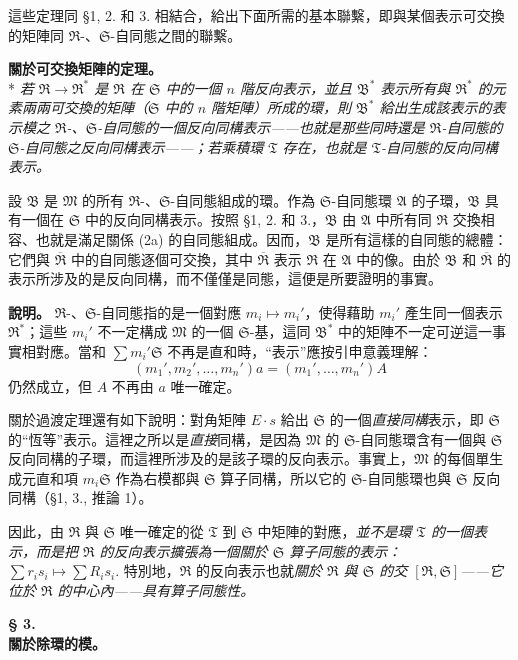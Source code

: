 \documentclass[11pt]{article}
\providecommand{\frR}{\mathfrak R}
\providecommand{\frS}{\mathfrak S}
\providecommand{\frT}{\mathfrak T}
\providecommand{\frM}{\mathfrak M}
\providecommand{\frB}{\mathfrak B}
\providecommand{\mA}{\mathfrak A}
\begin{document}
這些定理同 §1, 2. 和 3. 相結合，給出下面所需的基本聯繫，即與某個表示可交換的矩陣同 \(\frR\)-、\(\frS\)-自同態之間的聯繫。

\noindent\textbf{關於可交換矩陣的定理。}\\*
\emph{若 \(\frR\to\frR^*\) 是 \(\frR\) 在 \(\frS\) 中的一個 \(n\) 階反向表示，並且 \(\frB^*\) 表示所有與 \(\frR^*\) 的元素兩兩可交換的矩陣（\(\frS\) 中的 \(n\) 階矩陣）所成的環，則 \(\frB^*\) 給出生成該表示的表示模之 \(\frR\)-、\(\frS\)-自同態的一個反向同構表示——也就是那些同時還是 \(\frR\)-自同態的 \(\frS\)-自同態之反向同構表示——；若乘積環 \(\frT\) 存在，也就是 \(\frT\)-自同態的反向同構表示。}

設 \(\frB\) 是 \(\frM\) 的所有 \(\frR\)-、\(\frS\)-自同態組成的環。作為 \(\frS\)-自同態環 \(\mA\) 的子環，\(\frB\) 具有一個在 \(\frS\) 中的反向同構表示。按照 §1, 2. 和 3.，\(\frB\) 由 \(\mA\) 中所有同 \(\frR\) 交換相容、也就是滿足關係 (2a) 的自同態組成。因而，\(\frB\) 是所有這樣的自同態的總體：它們與 \(\overline{\frR}\) 中的自同態逐個可交換，其中 \(\overline{\frR}\) 表示 \(\frR\) 在 \(\mA\) 中的像。由於 \(\frB\) 和 \(\overline{\frR}\) 的表示所涉及的是反向同構，而不僅僅是同態，這便是所要證明的事實。

\noindent\textbf{說明。} \(\frR\)-、\(\frS\)-自同態指的是一個對應 \(m_i\mapsto m_i'\)，使得藉助 \(m_i'\) 產生同一個表示 \(\frR^*\)；這些 \(m_i'\) 不一定構成 \(\frM\) 的一個 \(\frS\)-基，這同 \(\frB^*\) 中的矩陣不一定可逆這一事實相對應。當和 \(\sum m_i'\frS\) 不再是直和時，“表示”應按引申意義理解：
\[
        (m_1',m_2',\ldots,m_n')a=(m_1',\ldots,m_n')A
\]
仍然成立，但 \(A\) 不再由 \(a\) 唯一確定。

關於過渡定理還有如下說明：對角矩陣 \(E\cdot s\) 給出 \(\frS\) 的一個\emph{直接同構}表示，即 \(\frS\) 的“恆等”表示。這裡之所以是\emph{直接}同構，是因為 \(\frM\) 的 \(\frS\)-自同態環含有一個與 \(\frS\) 反向同構的子環，而這裡所涉及的是該子環的反向表示。事實上，\(\frM\) 的每個單生成元直和項 \(m_i\frS\) 作為右模都與 \(\frS\) 算子同構，所以它的 \(\frS\)-自同態環也與 \(\frS\) 反向同構（§1, 3., 推論 1）。

因此，由 \(\frR\) 與 \(\frS\) 唯一確定的從 \(\frT\) 到 \(\frS\) 中矩陣的對應，\emph{並不是環 \(\frT\) 的一個表示，而是把 \(\frR\) 的反向表示擴張為一個關於 \(\frS\) 算子同態的表示：} \(\sum r_i s_i\longmapsto \sum R_i s_i.\)
特別地，\(\frR\) 的反向表示也就\emph{關於 \(\frR\) 與 \(\frS\) 的交 \([\frR,\frS]\)——它位於 \(\frR\) 的中心內——具有算子同態性。}
\begin{center}
\textbf{§ 3.}\\[0.4em]
\textbf{關於除環的模。}
\end{center}
\end{document}
